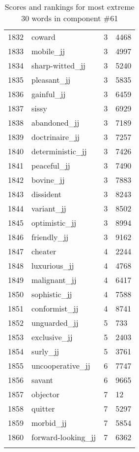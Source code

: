 \begin{longtable}[!htbp]{| rlr@{.}l |}
    1832 & coward & 3 & 4468 \\
    1833 & mobile\_jj & 3 & 4997 \\
    1834 & sharp-witted\_jj & 3 & 5240 \\
    1835 & pleasant\_jj & 3 & 5835 \\
    1836 & gainful\_jj & 3 & 6459 \\
    1837 & sissy & 3 & 6929 \\
    1838 & abandoned\_jj & 3 & 7189 \\
    1839 & doctrinaire\_jj & 3 & 7257 \\
    1840 & deterministic\_jj & 3 & 7426 \\
    1841 & peaceful\_jj & 3 & 7490 \\
    1842 & bovine\_jj & 3 & 7883 \\
    1843 & dissident & 3 & 8243 \\
    1844 & variant\_jj & 3 & 8502 \\
    1845 & optimistic\_jj & 3 & 8994 \\
    1846 & friendly\_jj & 3 & 9162 \\
    1847 & cheater & 4 & 2244 \\
    1848 & luxurious\_jj & 4 & 4768 \\
    1849 & malignant\_jj & 4 & 6417 \\
    1850 & sophistic\_jj & 4 & 7588 \\
    1851 & conformist\_jj & 4 & 8741 \\
    1852 & unguarded\_jj & 5 & 733 \\
    1853 & exclusive\_jj & 5 & 2403 \\
    1854 & surly\_jj & 5 & 3761 \\
    1855 & uncooperative\_jj & 6 & 7747 \\
    1856 & savant & 6 & 9665 \\
    1857 & objector & 7 & 12 \\
    1858 & quitter & 7 & 5297 \\
    1859 & morbid\_jj & 7 & 5854 \\
    1860 & forward-looking\_jj & 7 & 6362 \\
    \hline
    \caption{Scores and rankings for most extreme 30 words in component \#61} \\
\end{longtable}

